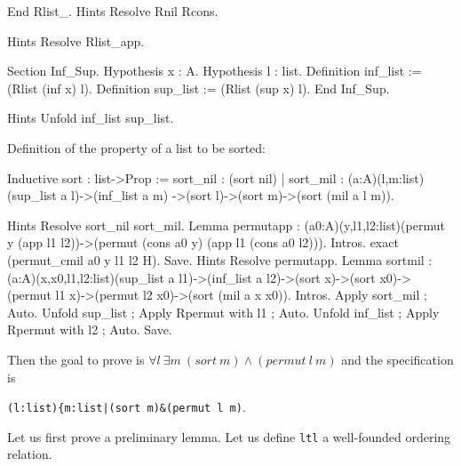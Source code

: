 \begin{coq_example*}
End Rlist_.
Hints Resolve Rnil Rcons.
\end{coq_example*}
\begin{coq_eval}
Hints Resolve Rlist_app.
\end{coq_eval}
\begin{coq_example*}
Section Inf_Sup.
Hypothesis x : A.
Hypothesis l : list.
Definition inf_list := (Rlist (inf x) l).
Definition sup_list := (Rlist (sup x) l).
End Inf_Sup.
\end{coq_example*}
\begin{coq_eval}
Hints Unfold  inf_list sup_list.
\end{coq_eval}
Definition of the property of a list to be sorted:
\begin{coq_example*}
Inductive sort : list->Prop :=
     sort_nil : (sort nil)
   | sort_mil : (a:A)(l,m:list)(sup_list a l)->(inf_list a m)
        ->(sort l)->(sort m)->(sort (mil a l m)).
\end{coq_example*}
\begin{coq_eval}
Hints Resolve sort_nil sort_mil.
Lemma permutapp : (a0:A)(y,l1,l2:list)(permut y (app l1 l2))->(permut (cons a0 y) (app l1 (cons a0 l2))).
Intros.
exact (permut_cmil a0 y l1 l2 H).
Save.
Hints Resolve permutapp.
Lemma sortmil : (a:A)(x,x0,l1,l2:list)(sup_list a l1)->(inf_list a l2)->(sort x)->(sort x0)->(permut l1 x)->(permut l2 x0)->(sort (mil a x x0)).
Intros.
Apply sort_mil ; Auto.
Unfold sup_list ; Apply Rpermut with l1 ; Auto. 
Unfold inf_list ; Apply Rpermut with l2 ; Auto.
Save.
\end{coq_eval}

\noindent Then the goal to prove is 
$\forall l~\exists m~(sort~m) \wedge (permut~l~m)$ and the specification is 

\verb!(l:list){m:list|(sort m)&(permut l m)!.

\noindent Let us first prove a preliminary lemma. Let us define \verb=ltl= a
well-founded ordering relation.

